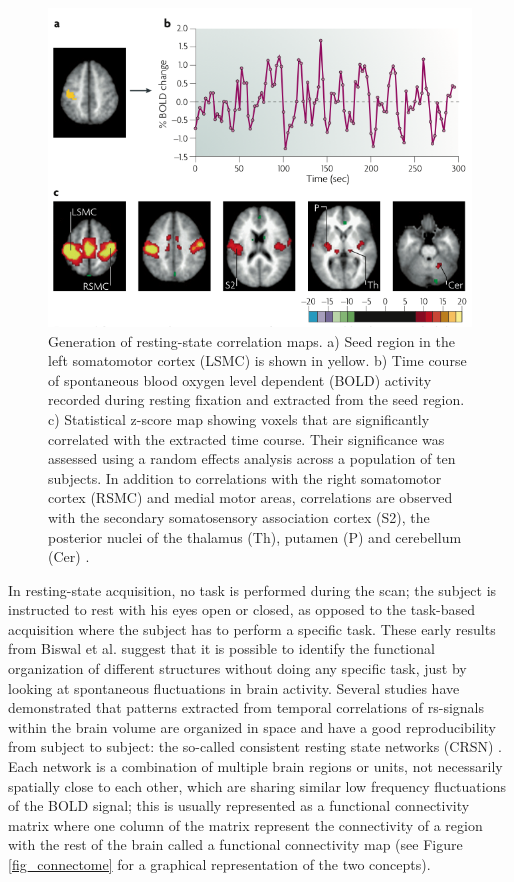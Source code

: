 \begin{figure}[H]
\begin{center}
\includegraphics[width=\linewidth]{../figures/resting_state.png}
\end{center}
\caption[Resting-state correlation maps]
{Generation of resting-state correlation maps. a) Seed region in the left somatomotor cortex (LSMC) is shown in yellow. b) Time course of spontaneous blood oxygen level dependent (BOLD) activity recorded during resting fixation and extracted from the seed region. c) Statistical z-score map showing voxels that are significantly correlated with the extracted time course. Their significance was assessed using a random effects analysis across a population of ten subjects. In addition to correlations with the right somatomotor cortex (RSMC) and medial motor areas, correlations are observed with the secondary somatosensory association cortex (S2), the posterior nuclei of the thalamus (Th), putamen (P) and cerebellum (Cer) \citep{Fox2007}.}
\label{fig_rs}
\end{figure}

In resting-state acquisition, no task is performed during the scan; the subject is instructed to rest with his eyes open or closed, as opposed to the task-based acquisition where the subject has to perform a specific task. These early results from Biswal et al. suggest that it is possible to identify the functional organization of different structures without doing any specific task, just by looking at spontaneous fluctuations in brain activity. Several studies have demonstrated that patterns extracted from temporal correlations of rs-signals within the brain volume are organized in space and have a good reproducibility from subject to subject: the so-called consistent resting state networks (CRSN) \citep{Damoiseaux2006}. Each network is a combination of multiple brain regions or units, not necessarily spatially close to each other, which are sharing similar low frequency fluctuations of the BOLD signal; this is usually represented as a functional connectivity matrix where one column of the matrix represent 
the connectivity of a region with the rest of the brain called a 
functional connectivity map (see Figure \ref{fig_connectome} for a graphical representation of the two concepts).


